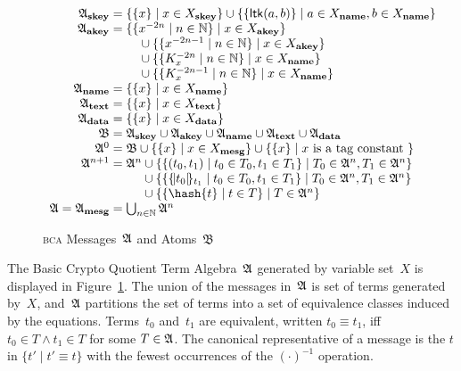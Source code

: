 \documentclass[12pt]{report}
\theoremstyle{definition}
\newcommand{\bca}{\textsc{bca}}
\newcommand{\alga}{\alg{A}}
\newcommand{\base}{\ensuremath{\mathfrak B}}
\begin{document}
\begin{figure}
$$\begin{array}{r@{{}={}}l}
\alga_{\dom{skey}}&\{\{x\}\mid x \in X_{\dom{skey}}\} \cup \{\{\cn{ltk}(a,b)\}\mid a \in X_{\dom{name}}, b \in X_{\dom{name}}\}\\
\alga_{\dom{akey}}&\begin{array}[t]{@{}l}
\{\{x^{-2n}\mid n\in\nat\}\mid x\in X_{\dom{akey}}\}\\
\quad{}\cup\{\{x^{-2n-1}\mid n\in\nat\}\mid x\in X_{\dom{akey}}\}\\
\quad{}\cup\{\{K_x^{-2n}\mid n\in\nat\}\mid x\in X_{\dom{name}}\}\\
\quad{}\cup\{\{K_x^{-2n-1}\mid n\in\nat\}\mid x\in X_{\dom{name}}\}\\
\end{array}\\
\alga_{\dom{name}}&\{\{x\}\mid x \in X_{\dom{name}}\}\\
\alga_{\dom{text}}&\{\{x\}\mid x \in X_{\dom{text}}\}\\
\alga_{\dom{data}}&\{\{x\}\mid x \in X_{\dom{data}}\}\\
\base&\alga_{\dom{skey}} \cup \alga_{\dom{akey}} \cup \alga_{\dom{name}} \cup \alga_{\dom{text}} \cup \alga_{\dom{data}}\\
\alga^0&\base\cup \{\{x\}\mid x\in X_{\dom{mesg}}\} \cup
\{\{x\}\mid x \hbox{ is a tag constant }\}\\
\alga^{n+1}&\alga^n
\begin{array}[t]{@{}l}
{}\cup\{\{(t_0,t_1)\mid t_0\in T_0, t_1\in T_1\}\mid
 T_0\in\alga^n,T_1\in\alga^n\}\\
{}\cup\{\{\enc{t_0}{t_1}\mid t_0\in T_0, t_1\in T_1\}\mid
 T_0\in\alga^n,T_1\in\alga^n\}\\
{}\cup\{\{\hash{t}\mid t\in T\}\mid T\in\alga^n\}
\end{array}\\
\alga = \alga_{\dom{mesg}}&\bigcup_{n\in\nat}\alga^n
\end{array}$$
\caption{{\bca} Messages~$\alga$ and Atoms~$\base$}\label{fig:algebra}
\end{figure}

The Basic Crypto Quotient Term Algebra~$\alga$ generated by variable
set~$X$ is displayed in Figure~\ref{fig:algebra}.  The union of the
messages in~$\alga$ is set of terms generated by~$X$, and~$\alga$
partitions the set of terms into a set of equivalence classes induced
by the equations.  Terms~$t_0$ and~$t_1$ are equivalent, written
$t_0\equiv t_1$, iff $t_0\in T\land t_1\in T$ for some $T\in\alga$.
The canonical representative of a message is the $t$ in $\{t'\mid
t'\equiv t\}$ with the fewest occurrences of the $(\cdot)^{-1}$
operation.
\end{document}
